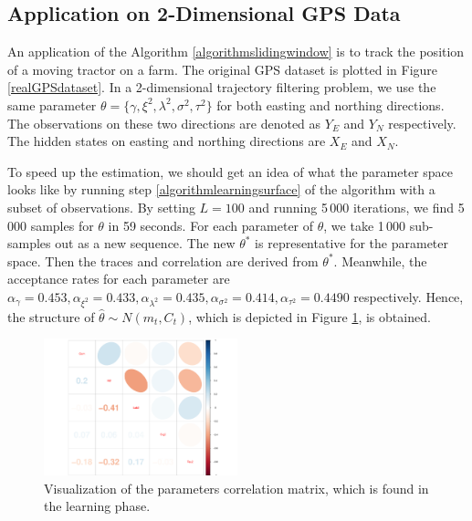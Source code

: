 \clearpage

\subsection{Application on 2-Dimensional GPS Data}

An application of the Algorithm \ref{algorithmslidingwindow} is to track the position of a moving tractor on a farm. The original GPS dataset is plotted in Figure \ref{realGPSdataset}. In a 2-dimensional trajectory filtering problem, we use the same parameter $\theta=\lbrace \gamma,\xi^2,\lambda^2,\sigma^2,\tau^2 \rbrace$ for both easting and northing directions. The observations on these two directions are denoted as $Y_E$ and $Y_N$ respectively. The hidden states on easting and northing directions are $X_E$ and $X_N$. 


To speed up the estimation, we should get an idea of what the parameter space looks like by running step \ref{algorithmlearningsurface} of the algorithm with a subset of observations. By setting $L=100$ and running 5\,000 iterations, we find 5\,000 samples for $\theta$ in 59 seconds. For each parameter of $\theta$, we take 1\,000 sub-samples out as a new sequence. The new $\theta^*$ is representative for the parameter space. Then the traces and correlation are derived from $\theta^*$. Meanwhile, the acceptance rates for each parameter are $\alpha_\gamma = 0.453,\alpha_{\xi^2}=0.433, \alpha_{\lambda^2}=0.435, \alpha_{\sigma^2}=0.414, \alpha_{\tau^2}=0.4490$ respectively. Hence, the structure of $\hat{\theta}\sim N\left( m_t,C_t\right)$, which is depicted in Figure \ref{realdatacorMatrix}, is obtained. 

\begin{figure}[h]
	\centering
	\includegraphics[width=0.5\textwidth]{Chapters/05MCMCOU/plots/realdatalearningcorMatrix.pdf}
	\caption{Visualization of the parameters correlation matrix, which is found in the learning phase. }\label{realdatacorMatrix}
\end{figure}

